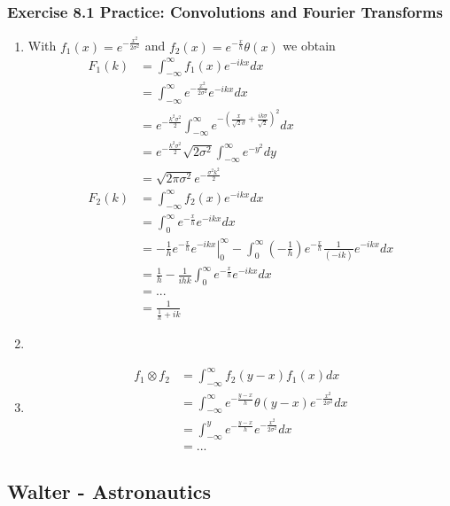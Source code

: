 \documentclass[10pt,a4paper]{article}
\theoremstyle{definition}
\begin{document}
\subsubsection{Exercise 8.1 Practice: Convolutions and Fourier Transforms}
\begin{enumerate}[label=(\alph*)]
\item With $f_1(x)=e^{-\frac{x^2}{2\sigma^2}}$ and $f_2(x)=e^{-\frac{x}{h}}\theta(x)$ we obtain
\begin{align}
    F_1(k)&=\int_{-\infty}^\infty f_1(x)e^{-ikx}dx\\
    &=\int_{-\infty}^\infty e^{-\frac{x^2}{2\sigma^2}}e^{-ikx}dx\\
    &=e^{-\frac{k^2\sigma^2}{2}}\int_{-\infty}^\infty e^{-\left(\frac{x}{\sqrt{2}\sigma}+\frac{ik\sigma}{\sqrt{2}}\right)^2}dx\\
    &=e^{-\frac{k^2\sigma^2}{2}} \sqrt{2\sigma^2} \int_{-\infty}^\infty e^{-y^2}dy\\
    &=\sqrt{2\pi\sigma^2}e^{-\frac{\sigma^2k^2}{2}}\\
    F_2(k)&=\int_{-\infty}^\infty f_2(x)e^{-ikx}dx\\
    &=\int_{0}^\infty e^{-\frac{x}{h}}e^{-ikx}dx\\
    &=-\frac{1}{h}\left.e^{-\frac{x}{h}}e^{-ikx}\right|_0^\infty -\int_{0}^\infty \left(-\frac{1}{h}\right)e^{-\frac{x}{h}}\frac{1}{(-ik)}e^{-ikx}dx\\
    &=\frac{1}{h} -\frac{1}{ihk}\int_{0}^\infty e^{-\frac{x}{h}}e^{-ikx}dx\\
    &= ...\\
    &=\frac{1}{\frac{1}{h}+ik}
\end{align}
\item
\item
\begin{align}
    f_1\otimes f_2
    &=\int_{-\infty}^\infty f_2(y-x)f_1(x)dx\\
    &=\int_{-\infty}^\infty e^{-\frac{y-x}{h}}\theta(y-x)e^{-\frac{x^2}{2\sigma^2}}dx\\
    &=\int_{-\infty}^y e^{-\frac{y-x}{h}}e^{-\frac{x^2}{2\sigma^2}}dx\\
    &=...
\end{align}
\end{enumerate}




\subsection{{\sc Walter} - Astronautics}
\end{document}
